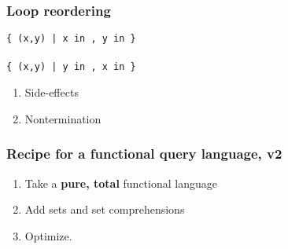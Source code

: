 \documentclass[xcolor=table]{beamer}
\begin{document}
\begin{frame}
  \frametitle{Loop reordering}
  \large
  \centering

  \texttt{\{ (x,y) | x in ,
    y in \}}
  \vspace{0.5em}\\
  {\Large {}}
  \vspace{0.5em}\\
  \texttt{\{ (x,y) | y in ,
    x in \}}

  \pause
  \vspace{3em}\Large
  \begin{minipage}{0.5\textwidth}
    \begin{enumerate}
    \item {\alt<3>{\color{red}}{} Side-effects}
    \item { Nontermination}
    \end{enumerate}
  \end{minipage}
\end{frame}


\begin{frame}
  \frametitle{Recipe for a functional query language, v2}
  \Large
  \begin{enumerate}\itemsep 1.5em
  \item Take a \textbf{pure, total} functional language
  \item Add sets and set comprehensions
  \item {\color{orange} Optimize.}
  \end{enumerate}
\end{frame}


\end{document}
